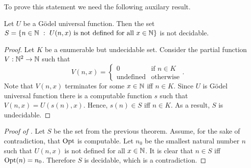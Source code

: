 To prove this statement we need the following auxilary result.
\begin{theorem}
\label{theorem:undefined-functions}
  Let $U$ be a G\"odel universal function. 
  Then the set 
  $S = \set[U(n, x) \text{ is not defined for all } x \in \N]{n \in \N}$ is
  not decidable.
\end{theorem}
\begin{proof}
  Let $K$ be a enumerable but undecidable set.
  Consider the partial function $V : {\mathbb{N}}^2 \to {\mathbb{N}}$ such that 
  \[
    V(n, x) = 
    \begin{cases}
      0 & \text{if } n \in K \\
      \text{undefined} & \text{otherwise}
    \end{cases}.
  \]
  Note that $V(n, x)$ terminates for some $x \in {\mathbb{N}}$ iff $n \in K$. 
  Since $U$ is G\"odel universal function there is a computable function $s$
  such that $V(n, x) = U(s(n), x)$. Hence, $s(n) \in S$ iff $n \in K$.
  As a result, $S$ is undecidable.
\end{proof}

\begin{proof}[Proof of ]
  Let $S$ be the set from the previous theorem.
  Assume, for the sake of contradiction, that $\mathrm{Opt}$ is computable. Let
  $n_0$ be the smallest natural number $n$ such that $U(n, x)$ is not defined
  for all $x \in {\mathbb{N}}$. It is clear that $n \in S$ iff $\mathrm{Opt}(n) = n_0$.
  Therefore $S$ is decidable, which is a contradiction.
\end{proof}

